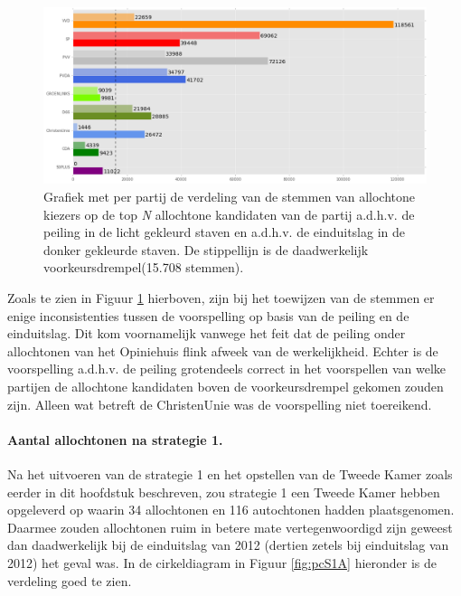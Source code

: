 \begin{figure}[H]

	\includegraphics[width=\linewidth]	{stemmen_op_allochtonen_topN_samen2.png}

			\caption{Grafiek met per partij de verdeling van de stemmen van allochtone kiezers op de top \textit{N} allochtone kandidaten van de partij a.d.h.v. de peiling \citep{Opiniehuis} in de licht gekleurd staven en a.d.h.v. de einduitslag \citep{Kiesraad_databank} in de donker gekleurde staven. De stippellijn is de daadwerkelijk voorkeursdrempel(15.708 stemmen).}

\label{fig:stemmenS1A}
\end{figure}


Zoals te zien in Figuur \ref{fig:stemmenS1A} hierboven, zijn bij het toewijzen van de stemmen er enige inconsistenties tussen de voorspelling op basis van de peiling en de einduitslag. Dit kom voornamelijk vanwege het feit dat de peiling onder allochtonen van het Opiniehuis \citeyearpar{Opiniehuis} flink afweek van de werkelijkheid. Echter is de voorspelling a.d.h.v. de peiling grotendeels correct in het voorspellen van welke partijen de allochtone kandidaten boven de voorkeursdrempel gekomen zouden zijn. Alleen wat betreft de ChristenUnie was de voorspelling niet toereikend.

\paragraph{Aantal allochtonen na strategie 1.}
Na het uitvoeren van de strategie 1 en het opstellen van de Tweede Kamer zoals eerder in dit hoofdstuk beschreven, zou strategie 1 een Tweede Kamer hebben opgeleverd op waarin 34 allochtonen en 116 autochtonen hadden plaatsgenomen. Daarmee zouden allochtonen ruim in betere mate vertegenwoordigd zijn geweest dan daadwerkelijk bij de einduitslag van 2012 (dertien zetels bij einduitslag van 2012) het geval was. In de cirkeldiagram in Figuur \ref{fig:pcS1A} hieronder is de verdeling goed te zien. 

